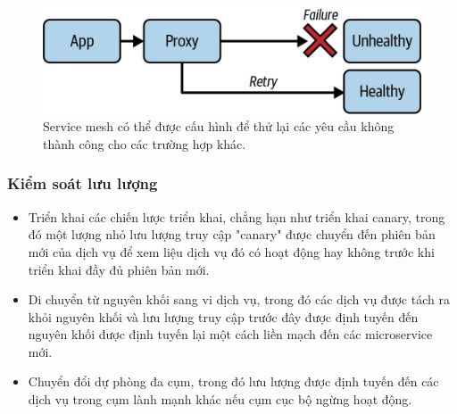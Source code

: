 \documentclass[14pt,a4paper]{report}
\begin{document}
{	\hspace{0.3cm}{Giảm thất bại có thể có nghĩa là thực hiện kiểm tra tình trạng để lưu lượng truy cập chỉ được gửi đến các dịch vụ khỏe mạnh. Xử lý lỗi có thể có nghĩa là thử lại các yêu cầu không thành công hoặc triển khai thời gian chờ, vì vậy một dịch vụ không chờ phản hồi mãi mãi.\\}
	
	\hspace{0.3cm}{Việc triển khai các kỹ thuật này trong mã tốn nhiều thời gian, dễ xảy ra lỗi và khó thực hiện một cách nhất quán trên tất cả các dịch vụ. Với service mesh, proxy có thể thực hiện các kỹ thuật này cho bất kỳ dịch vụ nào - tất cả những gì chúng ta cần làm là tương tác với control plane. Chúng ta cũng có thể điều chỉnh cài đặt theo thời gian thực khi tải dịch vụ thay đổi.\\}
	
	\begin{figure}[h]
		\centering
		\includegraphics[width=0.7\linewidth]{Pics/reliability}
		\caption{\label{fig:reliability} Service mesh có thể được cấu hình để thử lại các yêu cầu không thành công cho các trường hợp khác.}
		\label{fig:reliability}
	\end{figure}
	
	\subsubsection{Kiểm soát lưu lượng}
	\hspace{1cm}{Kiểm soát lưu lượng là về việc kiểm soát nơi lưu lượng giữa các dịch vụ được định tuyến. Kiểm soát lưu lượng giải quyết nhiều vấn đề:}
	
	\begin{itemize}
		\item Triển khai các chiến lược triển khai, chẳng hạn như triển khai canary, trong đó một lượng nhỏ  lưu lượng truy cập "canary" được chuyển đến phiên bản mới của dịch vụ để xem liệu dịch vụ đó có hoạt động hay không trước khi triển khai đầy đủ phiên bản mới.
		\smallskip
		\item Di chuyển từ nguyên khối sang vi dịch vụ, trong đó các dịch vụ được tách ra khỏi nguyên khối và lưu lượng truy cập trước đây được định tuyến đến nguyên khối được định tuyến lại một cách liền mạch đến các microservice mới.
		\smallskip
		\item Chuyển đổi dự phòng đa cụm, trong đó lưu lượng được định tuyến đến các dịch vụ trong cụm lành mạnh khác nếu cụm cục bộ ngừng hoạt động.
	\end{itemize}

}
\end{document}
